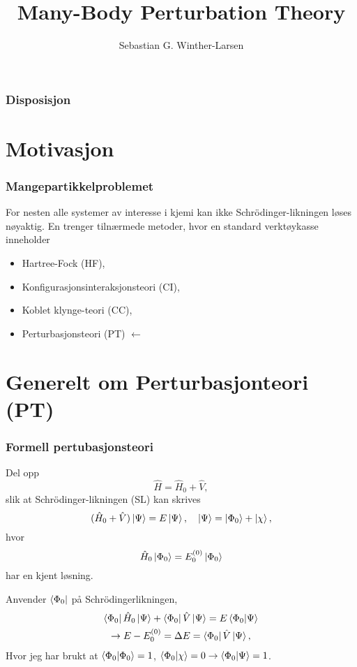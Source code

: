 \documentclass{beamer}
\title[MBPT]{Many-Body Perturbation Theory}
\author{Sebastian G. Winther-Larsen}
\begin{document}
\begin{frame}
	\titlepage
\end{frame}

\begin{frame}
	\frametitle{Disposisjon}
	\tableofcontents
\end{frame}

\section{Motivasjon}
\begin{frame}
	\frametitle{Mangepartikkelproblemet}
	For nesten alle systemer av interesse i kjemi kan ikke Schrödinger-likningen løses nøyaktig. 
	En trenger tilnærmede metoder, hvor en standard verktøykasse inneholder
	\begin{itemize}
	\item Hartree-Fock (HF),
	\item Konfigurasjonsinteraksjonsteori (CI),
	\item Koblet klynge-teori (CC),
	\item Perturbasjonsteori (PT) $\leftarrow$
	\end{itemize}
\end{frame}

\section{Generelt om Perturbasjonteori (PT)}
\begin{frame}
	\frametitle{Formell pertubasjonsteori}
	
	Del opp 
	\begin{equation}
		\hat H = \hat H_0 + \hat V,
	\end{equation}
	slik at Schrödinger-likningen (SL) kan skrives
	\begin{equation}
		(\hat H_0 + \hat V)\ket{\Psi} = E\ket{\Psi}, \quad \ket{\Psi} = \ket{\Phi_0} + \ket{\chi},
	\end{equation}
	hvor
	\begin{equation}
		\hat H_0 \ket{\Phi_0} = E^{(0)}_0\ket{\Phi_0}
	\end{equation}
	har en kjent løsning.
\end{frame}

\begin{frame}
	
	Anvender $\bra{\Phi_0}$ på Schrödingerlikningen,
	\begin{gather}
		\bra{\Phi_0}\hat H_0 \ket{\Psi} + \bra{\Phi_0}\hat V \ket{\Psi} = E\braket{\Phi_0}{\Psi} \\
		\rightarrow E  - E_0^{(0)} = \Delta E = \bra{\Phi_0}\hat V \ket{\Psi},
	\end{gather}
	Hvor jeg har brukt at $\braket{\Phi_0}{\Phi_0} = 1$, $\braket{\Phi_0}{\chi} = 0 \rightarrow \braket{\Phi_0}{\Psi} = 1$.
	
\end{frame}
\end{document}

